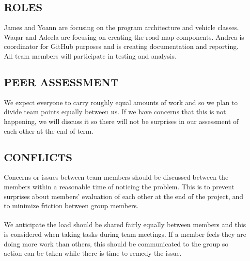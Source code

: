 \documentclass[11pt]{article}
\begin{document}
\subsection{ROLES}

James and Yoann are focusing on the program architecture and vehicle classes. Waqar and 
Adeela are focusing on creating the road map components. Andrea is coordinator for GitHub 
purposes and is creating documentation and reporting. All team members will participate 
in testing and analysis.


\subsection{PEER ASSESSMENT}

We expect everyone to carry roughly equal amounts of work and so we plan to divide team 
points equally between us. If we have concerns that this is not happening, we will 
discuss it so there will not be surprises in our assessment of each other at the end of term.


\subsection{CONFLICTS}

Concerns or issues between team members should be discussed between the members within 
a reasonable time of noticing the problem. This is to prevent surprises about members' 
evaluation of each other at the end of the project, and to minimize friction between 
group members.
\\ \\
We anticipate the load should be shared fairly equally between members and 
this is considered when taking tasks during team meetings. If a member feels 
they are doing more work than others, this should be communicated to the group so action 
can be taken while there is time to remedy the issue.
\end{document}
